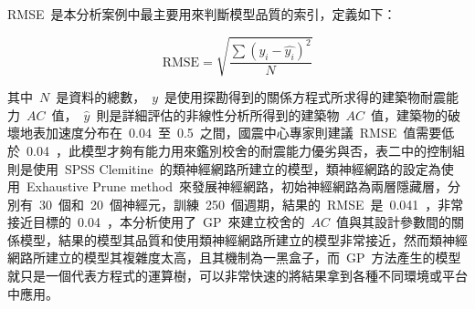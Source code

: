 RMSE~是本分析案例中最主要用來判斷模型品質的索引，定義如下：


\begin{equation} \text{RMSE} = \sqrt{\dfrac{\sum{(y_i - \hat{y_i})^2}}{N}} \label{eq:RMSE2}\end{equation}

其中~$N$~是資料的總數，~$y$~是使用探勘得到的關係方程式所求得的建築物耐震能力~$AC$~值，~$\hat{y}$~則是詳細評估的非線性分析所得到的建築物~$AC$~值，建築物的破壞地表加速度分布在~0.04~至~0.5~之間，國震中心專家則建議~RMSE~值需要低於~0.04~，此模型才夠有能力用來鑑別校舍的耐震能力優劣與否，表二中的控制組則是使用~SPSS Clemitine~的類神經網路所建立的模型，類神經網路的設定為使用~Exhaustive Prune method~來發展神經網路，初始神經網路為兩層隱藏層，分別有~30~個和~20~個神經元，訓練~250~個週期，結果的~RMSE~是~0.041~，非常接近目標的~0.04~，本分析使用了~GP~來建立校舍的~$AC$~值與其設計參數間的關係模型，結果的模型其品質和使用類神經網路所建立的模型非常接近，然而類神經網路所建立的模型其複雜度太高，且其機制為一黑盒子，而~GP~方法產生的模型就只是一個代表方程式的運算樹，可以非常快速的將結果拿到各種不同環境或平台中應用。


